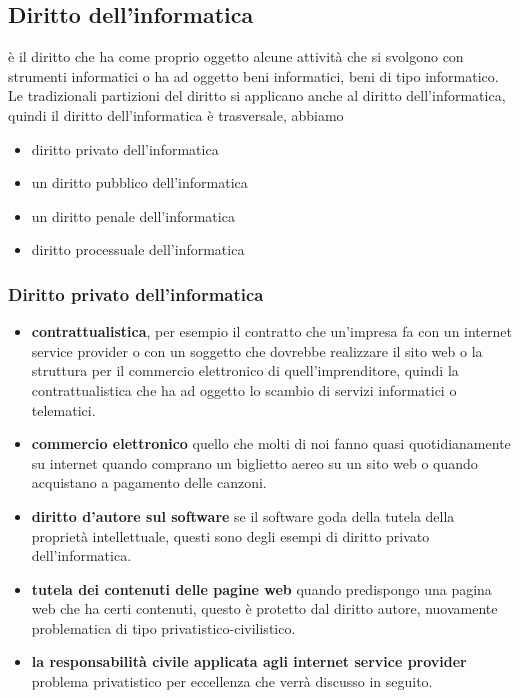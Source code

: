 \subsection{Diritto dell'informatica} è il diritto che ha come proprio oggetto alcune attività che si svolgono con strumenti informatici o ha ad oggetto beni informatici, beni di tipo informatico. Le tradizionali partizioni del diritto si applicano anche al diritto dell'informatica, quindi il diritto dell'informatica è trasversale, abbiamo 
\begin{itemize}
    \item diritto privato dell'informatica
    \item un diritto pubblico dell'informatica 
    \item un diritto penale dell'informatica 
    \item diritto processuale dell'informatica 
\end{itemize}

\subsubsection{Diritto privato dell'informatica}

\begin{itemize}
    \item \textbf{contrattualistica}, per esempio il contratto che un'impresa fa con un internet service provider o con un soggetto che dovrebbe realizzare il sito web o la struttura per il commercio elettronico di quell'imprenditore, quindi la contrattualistica che ha ad oggetto lo scambio di servizi informatici o telematici.
    \item \textbf{commercio elettronico} quello che molti di noi fanno quasi quotidianamente su internet quando comprano un biglietto aereo su un sito web o quando acquistano a pagamento delle canzoni. 
    \item \textbf{diritto d'autore sul software} se il software goda della tutela della proprietà intellettuale, questi sono degli esempi di diritto privato dell'informatica.  
    \item \textbf{tutela dei contenuti delle pagine web} quando predispongo una pagina web che ha certi contenuti, questo è protetto dal diritto autore, nuovamente problematica di tipo privatistico-civilistico. 
    \item \textbf{la responsabilità civile applicata agli internet service provider} problema privatistico per eccellenza che verrà discusso in seguito.

\end{itemize}


